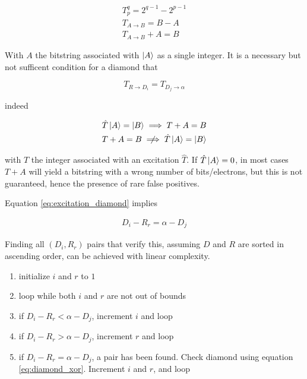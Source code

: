 \documentclass[./thesis.tex]{subfiles}
\begin{document}
\begin{align}
T_p^q = 2^{q-1} - 2^{p-1} \\
T_{A \rightarrow B} = B - A \\
T_{A \rightarrow B} + A = B 
\end{align}

With $A$ the bitstring associated with $\ket A$ as a single integer. It is a necessary but not sufficent condition for a diamond that

\begin{equation}
T_{R \rightarrow D_i} = T_{D_j \rightarrow \alpha}
\end{equation}

indeed 

\begin{align}
\hat T \ket A = \ket B \implies  T + A = B\\
T + A = B \centernot \implies \hat T \ket A = \ket B
\end{align}

with $T$ the integer associated with an excitation $\hat T$. If $\hat T \ket A = 0$, in most cases $T + A$ will yield a bitstring with a wrong number of bits/electrons, but this is not guaranteed, hence the presence of rare false positives.

Equation \ref{eq:excitation_diamond} implies

\begin{align}
D_i - R_r = \alpha - D_j 
\end{align}

Finding all $(D_i, R_r)$ pairs that verify this, assuming $D$ and $R$ are sorted in ascending order, can be achieved with linear complexity.


\begin{enumerate}
\item
initialize $i$ and $r$ to $1$
\item
loop while both $i$ and $r$ are not out of bounds
\item
if $D_i - R_r < \alpha - D_j$, increment $i$ and loop
\item
if $D_i - R_r > \alpha - D_j$, increment $r$ and loop
\item
if $D_i - R_r = \alpha - D_j$, a pair has been found. Check diamond using equation \ref{eq:diamond_xor}. Increment $i$ and $r$, and loop
\end{enumerate}
\end{document}
